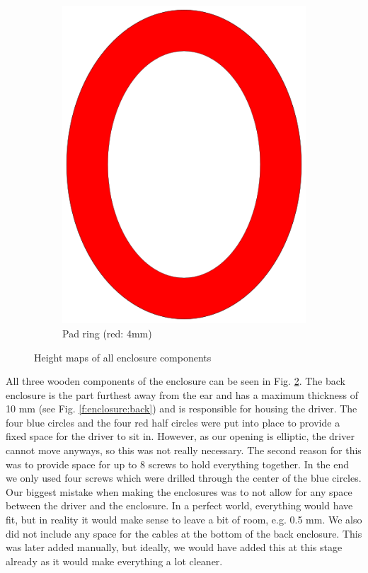 \documentclass{article}
\begin{document}
\begin{figure}[htb]
\begin{subfigure}[b]{0.24\textwidth}
        \includegraphics[width=\textwidth]{images/pad_height_map.png}
        \caption{Pad ring (red: 4mm)}
        \label{f:enclosure:pad}
    \end{subfigure}
    \caption{Height maps of all enclosure components}
    \label{f:enclosure:components}
\end{figure}

All three wooden components of the enclosure can be seen in Fig. \ref{f:enclosure:components}. The back enclosure is the part furthest away from the ear and has a maximum thickness of 10 mm (see Fig. \ref{f:enclosure:back}) and is responsible for housing the driver. The four blue circles and the four red half circles were put into place to provide a fixed space for the driver to sit in. However, as our opening is elliptic, the driver cannot move anyways, so this was not really necessary. The second reason for this was to provide space for up to 8 screws to hold everything together. In the end we only used four screws which were drilled through the center of the blue circles. Our biggest mistake when making the enclosures was to not allow for any space between the driver and the enclosure. In a perfect world, everything would have fit, but in reality it would make sense to leave a bit of room, e.g. 0.5 mm. We also did not include any space for the cables at the bottom of the back enclosure. This was later added manually, but ideally, we would have added this at this stage already as it would make everything a lot cleaner.
\end{document}
